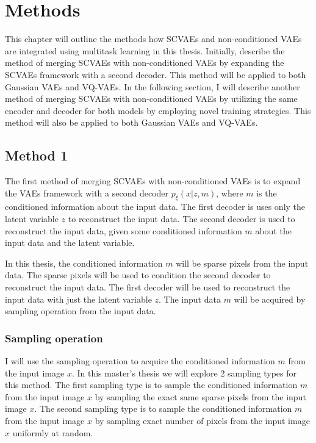 \chapter{Methods}

This chapter will outline the methods how SCVAEs and non-conditioned VAEs are integrated using multitask learning in this thesis. Initially, describe the method of merging SCVAEs with non-conditioned VAEs by expanding the SCVAEs framework with a second decoder. This method will be applied to both Gaussian VAEs and VQ-VAEs. In the following section, I will describe another method of merging SCVAEs with non-conditioned VAEs by utilizing the same encoder and decoder for both models by employing novel training strategies. This method will also be applied to both Gaussian VAEs and VQ-VAEs.

\section{Method 1}

The first method of merging SCVAEs with non-conditioned VAEs is to expand the VAEs framework with a second decoder $p_\xi(x|z,m)$, where $m$ is the conditioned information about the input data.
The first decoder is uses only the latent variable $z$ to reconstruct the input data. The second decoder is used to reconstruct the input data, given some conditioned information $m$ about the input data and the latent variable. 

In this thesis, the conditioned information $m$ will be sparse pixels from the input data. The sparse pixels will be used to condition the second decoder to reconstruct the input data. The first decoder will be used to reconstruct the input data with just the latent variable $z$. The input data $m$ will be acquired by sampling operation from the input data.

\subsection{Sampling operation}

I will use the sampling operation to acquire the conditioned information $m$ from the input image $x$. In this master's thesis we will explore 2 sampling types for this method. The first sampling type is to sample the conditioned information $m$ from the input image $x$ by sampling the exact same sparse pixels from the input image $x$. The second sampling type is to sample the conditioned information $m$ from the input image $x$ by sampling exact number of pixels from the input image $x$ uniformly at random. 

